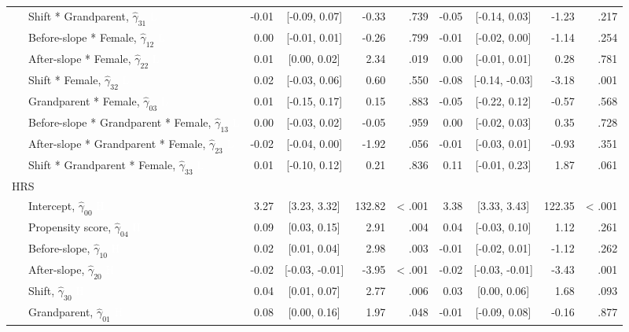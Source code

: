 \documentclass[
  english,
  man, noextraspace]{apa7}
\newenvironment{lltable}{\begin{landscape}\begin{center}\begin{ThreePartTable}}{\end{ThreePartTable}\end{center}\end{landscape}}
\begin{document}
\begin{appendix}
\begin{lltable}
{\begin{longtable}{lrcrrrcrr}
\ \ \ Shift * Grandparent, $\hat{\gamma}_{31}$ \textcolor{white}{L} & -0.01 & [-0.09, 0.07] & -0.33 & .739 & -0.05 & [-0.14, 0.03] & -1.23 & .217\\
\ \ \ Before-slope * Female, $\hat{\gamma}_{12}$ \textcolor{white}{L} & 0.00 & [-0.01, 0.01] & -0.26 & .799 & -0.01 & [-0.02, 0.00] & -1.14 & .254\\
\ \ \ After-slope * Female, $\hat{\gamma}_{22}$ \textcolor{white}{L} & 0.01 & [0.00, 0.02] & 2.34 & .019 & 0.00 & [-0.01, 0.01] & 0.28 & .781\\
\ \ \ Shift * Female, $\hat{\gamma}_{32}$ \textcolor{white}{L} & 0.02 & [-0.03, 0.06] & 0.60 & .550 & -0.08 & [-0.14, -0.03] & -3.18 & .001\\
\ \ \ Grandparent * Female, $\hat{\gamma}_{03}$ \textcolor{white}{L} & 0.01 & [-0.15, 0.17] & 0.15 & .883 & -0.05 & [-0.22, 0.12] & -0.57 & .568\\
\ \ \ Before-slope * Grandparent * Female, $\hat{\gamma}_{13}$ \textcolor{white}{L} & 0.00 & [-0.03, 0.02] & -0.05 & .959 & 0.00 & [-0.02, 0.03] & 0.35 & .728\\
\ \ \ After-slope * Grandparent * Female, $\hat{\gamma}_{23}$ \textcolor{white}{L} & -0.02 & [-0.04, 0.00] & -1.92 & .056 & -0.01 & [-0.03, 0.01] & -0.93 & .351\\
\ \ \ Shift * Grandparent * Female, $\hat{\gamma}_{33}$ \textcolor{white}{L} & 0.01 & [-0.10, 0.12] & 0.21 & .836 & 0.11 & [-0.01, 0.23] & 1.87 & .061\\
HRS &  &  &  &  &  &  &  & \\
\ \ \ Intercept, $\hat{\gamma}_{00}$ \textcolor{white}{H} & 3.27 & [3.23, 3.32] & 132.82 & < .001 & 3.38 & [3.33, 3.43] & 122.35 & < .001\\
\ \ \ Propensity score, $\hat{\gamma}_{04}$ \textcolor{white}{H} & 0.09 & [0.03, 0.15] & 2.91 & .004 & 0.04 & [-0.03, 0.10] & 1.12 & .261\\
\ \ \ Before-slope, $\hat{\gamma}_{10}$ \textcolor{white}{H} & 0.02 & [0.01, 0.04] & 2.98 & .003 & -0.01 & [-0.02, 0.01] & -1.12 & .262\\
\ \ \ After-slope, $\hat{\gamma}_{20}$ \textcolor{white}{H} & -0.02 & [-0.03, -0.01] & -3.95 & < .001 & -0.02 & [-0.03, -0.01] & -3.43 & .001\\
\ \ \ Shift, $\hat{\gamma}_{30}$ \textcolor{white}{H} & 0.04 & [0.01, 0.07] & 2.77 & .006 & 0.03 & [0.00, 0.06] & 1.68 & .093\\
\ \ \ Grandparent, $\hat{\gamma}_{01}$ \textcolor{white}{H} & 0.08 & [0.00, 0.16] & 1.97 & .048 & -0.01 & [-0.09, 0.08] & -0.16 & .877\\

\end{longtable}}
\end{lltable}
\end{appendix}
\end{document}
